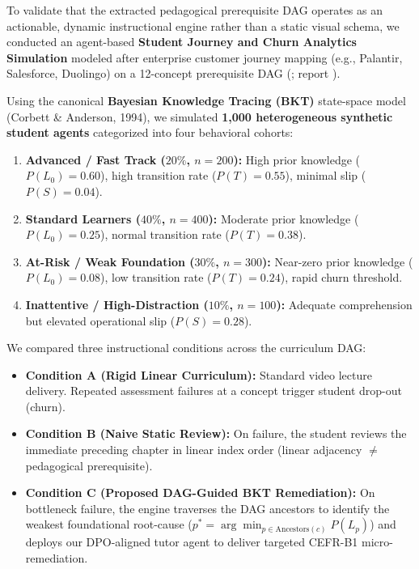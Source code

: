 \documentclass[a4paper,12pt]{report}
\begin{document}
To validate that the extracted pedagogical prerequisite DAG operates as an actionable, dynamic instructional engine rather than a static visual schema, we conducted an agent-based \textbf{Student Journey and Churn Analytics Simulation} modeled after enterprise customer journey mapping (e.g., Palantir, Salesforce, Duolingo) on a 12-concept prerequisite DAG (; report ).

Using the canonical \textbf{Bayesian Knowledge Tracing (BKT)} state-space model (Corbett \& Anderson, 1994), we simulated \textbf{1,000 heterogeneous synthetic student agents} categorized into four behavioral cohorts:
\begin{enumerate}
    \item \textbf{Advanced / Fast Track ($20\%$, $n=200$):} High prior knowledge ($P(L_0)=0.60$), high transition rate ($P(T)=0.55$), minimal slip ($P(S)=0.04$).
    \item \textbf{Standard Learners ($40\%$, $n=400$):} Moderate prior knowledge ($P(L_0)=0.25$), normal transition rate ($P(T)=0.38$).
    \item \textbf{At-Risk / Weak Foundation ($30\%$, $n=300$):} Near-zero prior knowledge ($P(L_0)=0.08$), low transition rate ($P(T)=0.24$), rapid churn threshold.
    \item \textbf{Inattentive / High-Distraction ($10\%$, $n=100$):} Adequate comprehension but elevated operational slip ($P(S)=0.28$).
\end{enumerate}

We compared three instructional conditions across the curriculum DAG:
\begin{itemize}
    \item \textbf{Condition A (Rigid Linear Curriculum):} Standard video lecture delivery. Repeated assessment failures at a concept trigger student drop-out (churn).
    \item \textbf{Condition B (Naive Static Review):} On failure, the student reviews the immediate preceding chapter in linear index order (linear adjacency $\neq$ pedagogical prerequisite).
    \item \textbf{Condition C (Proposed DAG-Guided BKT Remediation):} On bottleneck failure, the engine traverses the DAG ancestors to identify the weakest foundational root-cause ($p^* = \arg\min_{p \in \text{Ancestors}(c)} P(L_p)$) and deploys our DPO-aligned tutor agent to deliver targeted CEFR-B1 micro-remediation.
\end{itemize}
\end{document}
